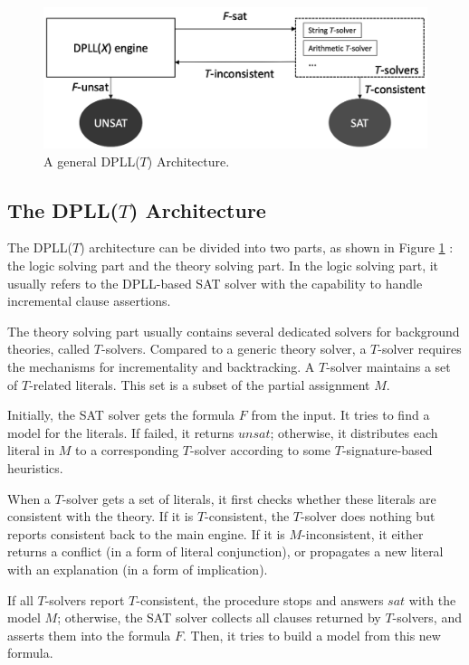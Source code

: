 \begin{figure}[htb]
	\begin{center}
		\includegraphics[width=0.8\linewidth]{pictures/dpll_arc.png}
	\end{center}
	\caption{A general DPLL(\(T\)) Architecture.}
	\label{fig:dpll_architecture}
\end{figure}

\subsection{The DPLL(\(T\)) Architecture}
\label{sec:The DPLL(T) Architecture}
The DPLL(\(T\)) architecture can be divided into two parts, as shown in Figure \ref{fig:dpll_architecture} : the logic solving part and the theory solving part. In the logic solving part, it usually refers to the DPLL-based SAT solver with  the capability to handle incremental clause assertions. 

The theory solving part usually contains several dedicated solvers for background theories, called \(T\)-solvers. Compared to a generic theory solver, a \(T\)-solver requires the mechanisms for incrementality and backtracking. A \(T\)-solver maintains a set of \(T\)-related literals. This set is a subset of the partial assignment \(M\).

Initially, the SAT solver gets the formula \(F\) from the input. It tries to find a model for the literals. If failed, it returns \(unsat\); otherwise, it distributes each literal in \(M\) to a corresponding \(T\)-solver according to some \(T\)-signature-based heuristics.

When a \(T\)-solver gets a set of literals, it first checks whether these literals are consistent with the theory. If it is \(T\)-consistent, the \(T\)-solver does nothing but reports consistent back to the main engine. If it is \(M\)-inconsistent, it either returns a conflict (in a form of literal conjunction), or propagates a new literal with an explanation (in a form of implication).

If all \(T\)-solvers report \(T\)-consistent, the procedure stops and answers \(sat\) with the model \(M\); otherwise, the SAT solver collects all clauses returned by \(T\)-solvers, and asserts them into the formula \(F\). Then, it tries to build a model from this new formula.